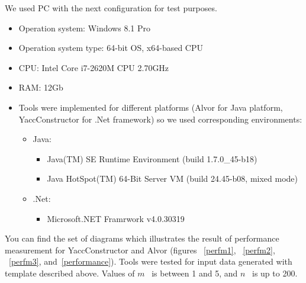 \documentclass{sigplanconf}
\begin{document}
We used PC with the next configuration for test purposes.

\begin{itemize}
    \item Operation system: Windows 8.1 Pro
    \item Operation system type: 64-bit OS, x64-based CPU
    \item CPU: Intel Core i7-2620M CPU 2.70GHz
    \item RAM: 12Gb
    \item Tools were implemented for different platforms (Alvor for Java platform, YaccConstructor for .Net framework) so we used corresponding environments:
        \begin{itemize}
        \item Java: 
            \begin{itemize}
                \item Java(TM) SE Runtime Environment (build 1.7.0\_45-b18)
                \item Java HotSpot(TM) 64-Bit Server VM (build 24.45-b08, mixed mode)
            \end{itemize}
        \item .Net:
            \begin{itemize}
                \item Microsoft.NET Framrwork v4.0.30319                
            \end{itemize}
        \end{itemize}
\end{itemize}

You can find the set of diagrams which illustrates the result of performance measurement for YaccConstructor and Alvor (figures ~\ref{perfm1}, ~\ref{perfm2}, ~\ref{perfm3}, and~\ref{performance}). Tools were tested for input data generated with template described above. Values of $m$ \ is between 1 and 5, and $n$ \ is up to 200.
\end{document}
